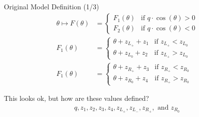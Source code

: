 \begin{frame}{Original Model Definition (1/3)}
    \vspace{-3.0em}
    \begin{align}
        \theta \mapsto F(\theta) & = \begin{cases}
                                         F_1(\theta) & \text{if } q \cdot \cos(\theta) > 0 \\
                                         F_2(\theta) & \text{if } q \cdot \cos(\theta) < 0
                                     \end{cases}
        \\
        F_1(\theta)              & = \begin{cases}
                                         \theta + z_{L_+} + z_1 & \text{if } z_{L_+} < z_{L_0} \\
                                         \theta + z_{L_0} + z_2 & \text{if } z_{L_+} > z_{L_0}
                                     \end{cases}
        \\
        F_1(\theta)              & = \begin{cases}
                                         \theta + z_{R_+} + z_3 & \text{if } z_{R_+} < z_{R_0} \\
                                         \theta + z_{R_0} + z_4 & \text{if } z_{R_+} > z_{R_0}
                                     \end{cases}
    \end{align}

    \pause
    \vspace{2em}
    This looks ok, but how are these values defined?
    \begin{align*}
        q, z_1, z_2, z_3, z_4, z_{L_+}, z_{L_-}, z_{R_+}, \text{ and } z_{R_0}
    \end{align*}
\end{frame}

